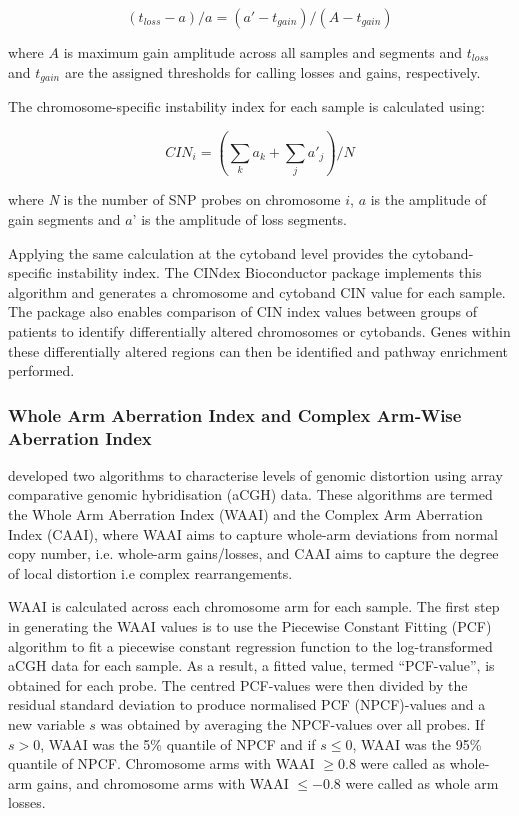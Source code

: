\begin{equation}
(t_{loss} - a)/a = (a'-t_{gain})/(A - t_{gain})
\end{equation}

where $A$ is maximum gain amplitude across all samples and segments and $t_{loss}$ and $t_{gain}$ are the assigned thresholds for calling losses and gains, respectively. 

The chromosome-specific instability index for each sample is calculated using:

\begin{equation}
CIN_i = (\sum_ka_k + \sum_ja'_j)/N
\end{equation}

where \textit{N} is the number of SNP probes on chromosome $i$, $a$ is the amplitude of gain segments and $a’$ is the amplitude of loss segments. 

Applying the same calculation at the cytoband level provides the cytoband-specific instability index. The CINdex Bioconductor package \citep{CINdex} implements this algorithm and generates a chromosome and cytoband CIN value for each sample. The package also enables comparison of CIN index values between groups of patients to identify differentially altered chromosomes or cytobands. Genes within these differentially altered regions can then be identified and pathway enrichment performed. 

\subsubsection{Whole Arm Aberration Index and Complex Arm‐Wise Aberration Index}
\cite{pmid20592421} developed two algorithms to characterise levels of genomic distortion using array comparative genomic hybridisation (aCGH) data. These algorithms are termed the Whole Arm Aberration Index (WAAI) and the Complex Arm Aberration Index (CAAI), where WAAI aims to capture whole-arm deviations from normal copy number, i.e. whole-arm gains/losses, and CAAI aims to capture the degree of local distortion i.e complex rearrangements. 

WAAI is calculated across each chromosome arm for each sample. The first step in generating the WAAI values is to use the Piecewise Constant Fitting (PCF) algorithm to fit a piecewise constant regression function to the log-transformed aCGH data for each sample. As a result, a fitted value, termed “PCF-value”, is obtained for each probe. The centred PCF-values were then divided by the residual standard deviation to produce normalised PCF (NPCF)-values and a new variable $s$ was obtained by averaging the NPCF-values over all probes. If $s > 0$, WAAI was the 5\% quantile of NPCF and if $s \leq 0$, WAAI was the 95\% quantile of NPCF. Chromosome arms with WAAI $\ge 0.8$ were called as whole-arm gains, and chromosome arms with WAAI $\leq -0.8$ were called as whole arm losses. 

